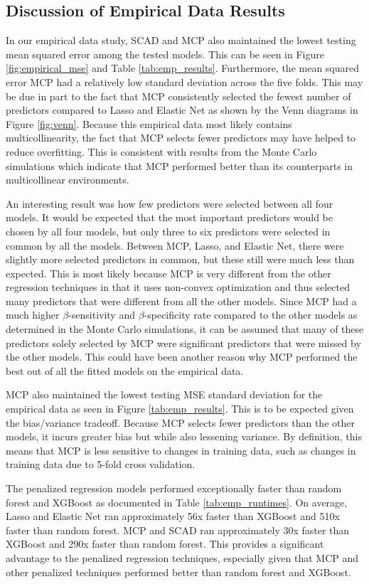 \documentclass{article}
\begin{document}
\subsection{Discussion of Empirical Data Results}
In our empirical data study, SCAD and MCP also maintained the lowest testing mean squared error among the tested models. This can be seen in Figure \ref{fig:empirical_mse} and Table \ref{tab:emp_results}. Furthermore, the mean squared error MCP had a relatively low standard deviation across the five folds. This may be due in part to the fact that MCP consistently selected the fewest number of predictors compared to Lasso and Elastic Net as shown by the Venn diagrams in Figure \ref{fig:venn}. Because this empirical data most likely contains multicollinearity, the fact that MCP selects fewer predictors may have helped to reduce overfitting. This is consistent with results from the Monte Carlo simulations which indicate that MCP performed better than its counterparts in multicollinear environments.

An interesting result was how few predictors were selected between all four models. It would be expected that the most important predictors would be chosen by all four models, but only three to six predictors were selected in common by all the models. Between MCP, Lasso, and Elastic Net, there were slightly more selected predictors in common, but these still were much less than expected. This is most likely because MCP is very different from the other regression techniques in that it uses non-convex optimization and thus selected many predictors that were different from all the other models. Since MCP had a much higher $\beta$-sensitivity and $\beta$-specificity rate compared to the other models as determined in the Monte Carlo simulations, it can be assumed that many of these predictors solely selected by MCP were significant predictors that were missed by the other models. This could have been another reason why MCP performed the best out of all the fitted models on the empirical data. 

MCP also maintained the lowest testing MSE standard deviation for the empirical data as seen in Figure \ref{tab:emp_results}. This is to be expected given the bias/variance tradeoff. Because MCP selects fewer predictors than the other models, it incurs greater bias but while also lessening variance. By definition, this means that MCP is less sensitive to changes in training data, such as changes in training data due to 5-fold cross validation. 

The penalized regression models performed exceptionally faster than random forest and XGBoost as documented in Table \ref{tab:emp_runtimes}. On average, Lasso and Elastic Net ran approximately 56x faster than XGBoost and 510x faster than random forest. MCP and SCAD ran approximately 30x faster than XGBoost and 290x faster than random forest. This provides a significant advantage to the penalized regression techniques, especially given that MCP and other penalized techniques performed better than random forest and XGBoost. 
\end{document}

